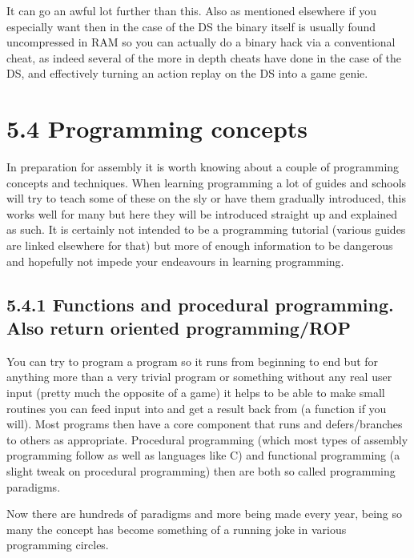 \documentclass[
]{book}
\begin{document}
It can go an awful lot further than this. Also as mentioned elsewhere if you especially want then in the case of the DS the binary itself is usually found uncompressed in RAM so you can actually do a binary hack via a conventional cheat, as indeed several of the more in depth cheats have done in the case of the DS, and effectively turning an action replay on the DS into a game genie.

\hypertarget{programming-concepts}{%
\section{5.4 Programming concepts}\label{programming-concepts}}

In preparation for assembly it is worth knowing about a couple of programming concepts and techniques. When learning programming a lot of guides and schools will try to teach some of these on the sly or have them gradually introduced, this works well for many but here they will be introduced straight up and explained as such. It is certainly not intended to be a programming tutorial (various guides are linked elsewhere for that) but more of enough information to be dangerous and hopefully not impede your endeavours in learning programming.

\hypertarget{functions-and-procedural-programming.-also-return-oriented-programmingrop}{%
\subsection{5.4.1 Functions and procedural programming. Also return oriented programming/ROP}\label{functions-and-procedural-programming.-also-return-oriented-programmingrop}}

You can try to program a program so it runs from beginning to end but for anything more than a very trivial program or something without any real user input (pretty much the opposite of a game) it helps to be able to make small routines you can feed input into and get a result back from (a function if you will). Most programs then have a core component that runs and defers/branches to others as appropriate. Procedural programming (which most types of assembly programming follow as well as languages like C) and functional programming (a slight tweak on procedural programming) then are both so called programming paradigms.

Now there are hundreds of paradigms and more being made every year, being so many the concept has become something of a running joke in various programming circles.
\end{document}
